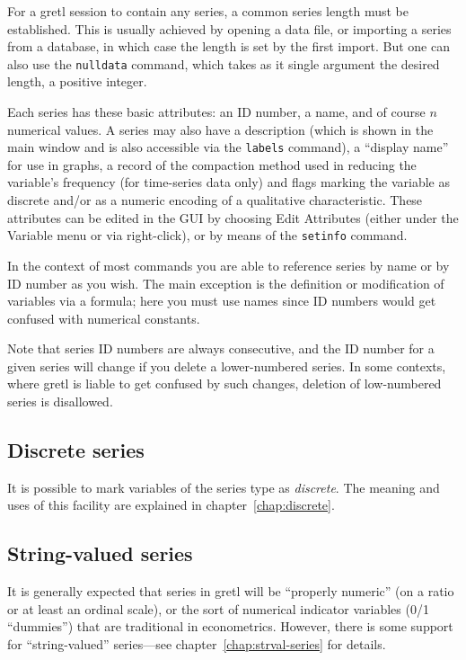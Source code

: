 For a gretl session to contain any series, a common series length must
be established. This is usually achieved by opening a data file, or
importing a series from a database, in which case the length is set by
the first import. But one can also use the \texttt{nulldata} command,
which takes as it single argument the desired length, a positive
integer.

Each series has these basic attributes: an ID number, a name, and of
course $n$ numerical values. A series may also have a description
(which is shown in the main window and is also accessible via the
\texttt{labels} command), a ``display name'' for use in graphs, a
record of the compaction method used in reducing the variable's
frequency (for time-series data only) and flags marking the variable
as discrete and/or as a numeric encoding of a qualitative
characteristic. These attributes can be edited in the GUI by choosing
\textsf{Edit Attributes} (either under the \textsf{Variable} menu or
via right-click), or by means of the \texttt{setinfo} command.

In the context of most commands you are able to reference series by
name or by ID number as you wish. The main exception is the definition
or modification of variables via a formula; here you must use names
since ID numbers would get confused with numerical constants.

Note that series ID numbers are always consecutive, and the ID number
for a given series will change if you delete a lower-numbered series.
In some contexts, where gretl is liable to get confused by such
changes, deletion of low-numbered series is disallowed.

\subsection{Discrete series}

It is possible to mark variables of the series type as
\textit{discrete}. The meaning and uses of this facility are explained
in chapter~\ref{chap:discrete}.

\subsection{String-valued series}

It is generally expected that series in gretl will be ``properly
numeric'' (on a ratio or at least an ordinal scale), or the sort of
numerical indicator variables (0/1 ``dummies'') that are traditional
in econometrics. However, there is some support for ``string-valued''
series---see chapter~\ref{chap:strval-series} for details.

